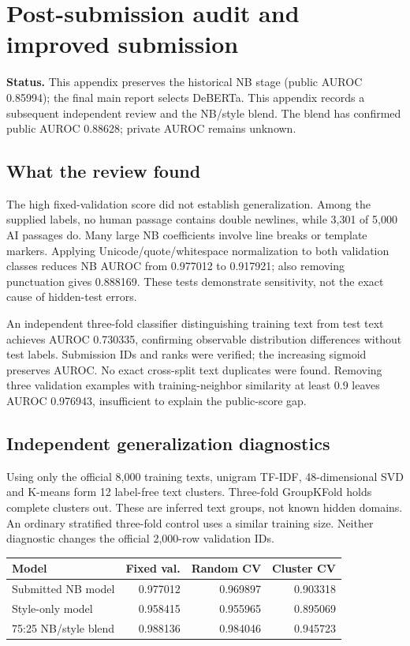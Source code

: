\newpage
\begingroup
\small
\setlength{\emergencystretch}{2em}
\section*{Post-submission audit and improved submission}
\textbf{Status.} This appendix preserves the historical NB stage (public AUROC 0.85994); the final main report selects DeBERTa. This appendix records a subsequent independent review and the NB/style blend. The blend has confirmed public AUROC 0.88628; private AUROC remains unknown.

\subsection*{What the review found}
The high fixed-validation score did not establish generalization. Among the supplied labels, no human passage contains double newlines, while 3,301 of 5,000 AI passages do. Many large NB coefficients involve line breaks or template markers. Applying Unicode/quote/whitespace normalization to both validation classes reduces NB AUROC from 0.977012 to 0.917921; also removing punctuation gives 0.888169. These tests demonstrate sensitivity, not the exact cause of hidden-test errors.

An independent three-fold classifier distinguishing training text from test text achieves AUROC 0.730335, confirming observable distribution differences without test labels. Submission IDs and ranks were verified; the increasing sigmoid preserves AUROC. No exact cross-split text duplicates were found. Removing three validation examples with training-neighbor similarity at least 0.9 leaves AUROC 0.976943, insufficient to explain the public-score gap.

\subsection*{Independent generalization diagnostics}
Using only the official 8,000 training texts, unigram TF-IDF, 48-dimensional SVD and K-means form 12 label-free text clusters. Three-fold GroupKFold holds complete clusters out. These are inferred text groups, not known hidden domains. An ordinary stratified three-fold control uses a similar training size. Neither diagnostic changes the official 2,000-row validation IDs.

\begin{tabularx}{\linewidth}{@{}Yrrr@{}}\toprule
Model & Fixed val. & Random CV & Cluster CV\\\midrule
Submitted NB model & 0.977012 & 0.969897 & 0.903318 \\
Style-only model & 0.958415 & 0.955965 & 0.895069 \\
75:25 NB/style blend & 0.988136 & 0.984046 & 0.945723 \\
\bottomrule\end{tabularx}\par
{}

